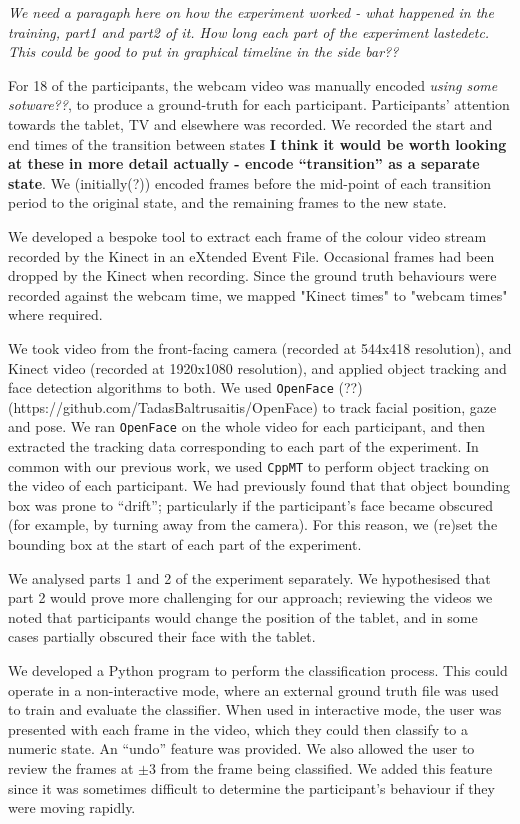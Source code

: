 \documentclass{sigchi-ext}
\begin{document}
\textit{We need a paragaph here on how the experiment worked - what happened in the training, part1 and part2 of it. How long each part of the experiment lastedetc.  This could be good to put in graphical timeline in the side bar??}


For 18 of the participants, the webcam video was manually encoded \textit{using some sotware??}, to produce a ground-truth for each participant.  Participants' attention towards the tablet, TV and elsewhere was recorded. We recorded the start and end times of the transition between states \textbf{I think it would be worth looking at these in more detail actually - encode ``transition'' as a separate state}. We (initially(?)) encoded frames before the mid-point of each transition period to the original state, and the remaining frames to the new state.

We developed a bespoke tool to extract each frame of the colour video stream recorded by the Kinect in an eXtended Event File.  Occasional frames had been dropped by the Kinect when recording.  Since the ground truth behaviours were recorded against the webcam time, we mapped "Kinect times" to "webcam times" where required.

We took video from the front-facing camera (recorded at 544x418 resolution), and Kinect video (recorded at 1920x1080 resolution), and applied object tracking and face detection algorithms to both.   We used \texttt{OpenFace} (??) (https://github.com/TadasBaltrusaitis/OpenFace) to track facial position, gaze and pose.  We ran \texttt{OpenFace} on the whole video for each participant, and then extracted the tracking data corresponding to each part of the experiment.  In common with our previous work, we used \texttt{CppMT} to perform object tracking on the video of each participant.  We had previously found that that object bounding box was prone to ``drift''; particularly if the participant's face became obscured (for example, by turning away from the camera).  For this reason, we (re)set the bounding box at the start of each part of the experiment.


We analysed parts 1 and 2 of the experiment separately.  We hypothesised that part 2 would prove more challenging for our approach; reviewing the videos we noted that participants would change the position of the tablet, and in some cases partially obscured their face with the tablet.

We developed a Python program to perform the classification process.  This could operate in a non-interactive mode, where an external ground truth file was used to train and evaluate the classifier.  When used in interactive mode, the user was presented with each frame in the video, which they could then classify to a numeric state.  An ``undo'' feature was provided.  We also allowed the user to review the frames at $\pm 3$ from the frame being classified.  We added this feature since it was sometimes difficult to determine the participant's behaviour if they were moving rapidly.  
\end{document}
